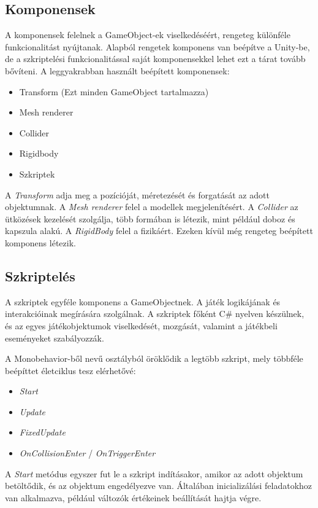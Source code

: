 \documentclass[
]{thesis-ekf}
\theoremstyle{definition}
\theoremstyle{remark}
\begin{document}
\subsection{Komponensek}

\label{sec:components}

A komponensek felelnek a GameObject-ek viselkedéséért, rengeteg különféle funkcionalitást nyújtanak. Alapból rengetek komponens van beépítve a Unity-be, de a szkriptelési funkcionalitással saját komponensekkel lehet ezt a tárat tovább bővíteni. A leggyakrabban használt beépített komponensek:
\begin{itemize}
 \item Transform (Ezt minden GameObject tartalmazza)
 \item Mesh renderer
 \item Collider
 \item Rigidbody
 \item Szkriptek
\end{itemize}

A \emph{Transform} adja meg a pozícióját, méretezését és forgatását az adott objektumnak. A \emph{Mesh renderer} felel a modellek megjelenítésért. A \emph{Collider} az ütközések kezelését szolgálja, több formában is létezik, mint például doboz és kapszula alakú. A \emph{RigidBody} felel a fizikáért. Ezeken kívül még rengeteg beépített komponens létezik.

\subsection{Szkriptelés}

A szkriptek egyféle komponens a GameObjectnek. A játék logikájának és interakcióinak megírására szolgálnak. A szkriptek főként C\# nyelven készülnek, és az egyes játékobjektumok viselkedését, mozgását, valamint a játékbeli eseményeket szabályozzák.


A Monobehavior-ből nevű osztályból öröklődik a legtöbb szkript, mely többféle beépíttet életciklus tesz elérhetővé:

\begin{itemize}
    \item \emph{Start}
    \item \emph{Update}
    \item \emph{FixedUpdate}
    \item \emph{OnCollisionEnter} / \emph{OnTriggerEnter}
\end{itemize}

A \emph{Start} metódus egyszer fut le a szkript indításakor, amikor az adott objektum betöltődik, és az objektum engedélyezve van. Általában inicializálási feladatokhoz van alkalmazva, például változók értékeinek beállítását hajtja végre.
\end{document}
